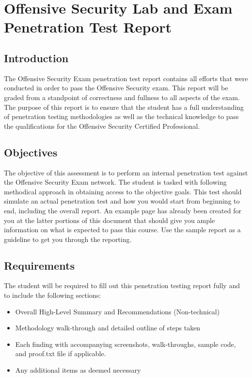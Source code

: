 
\chapter{\label{ch:report}Offensive Security Lab and Exam Penetration Test Report}

\section{\label{sec:introduction}Introduction}
The Offensive Security Exam penetration test report contains all efforts that
were conducted in order to pass the Offensive Security exam. This report will
be graded from a standpoint of correctness and fullness to all aspects of the
exam. The purpose of this report is to ensure that the student has a full
understanding of penetration testing methodologies as well as the technical
knowledge to pass the qualifications for the Offensive Security Certified
Professional.

\section{\label{sec:objectives}Objectives}
The objective of this assessment is to perform an internal penetration test
against the Offensive Security Exam network. The student is tasked with
following methodical approach in obtaining access to the objective goals. This
test should simulate an actual penetration test and how you would start from
beginning to end, including the overall report. An example page has already
been created for you at the latter portions of this document that should give
you ample information on what is expected to pass this course. Use the sample
report as a guideline to get you through the reporting.

\section{\label{sec:requirements}Requirements}
The student will be required to fill out this penetration testing report fully and to include the following sections:
\begin{itemize}
  \item Overall High-Level Summary and Recommendations (Non-technical)
  \item Methodology walk-through and detailed outline of steps taken
  \item Each finding with accompanying screenshots, walk-throughs, sample code, and proof.txt file if applicable.
  \item Any additional items as deemed necessary
\end{itemize}
